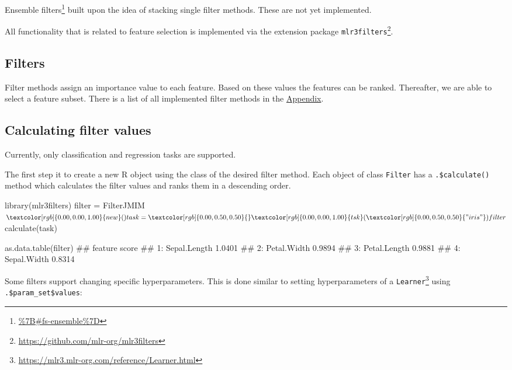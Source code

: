 \documentclass[12pt,]{scrbook}
\newenvironment{Shaded}{}{}
\newcommand{\KeywordTok}[1]{\textcolor[rgb]{0.00,0.00,1.00}{#1}}
\newcommand{\NormalTok}[1]{#1}
\newcommand{\OperatorTok}[1]{#1}
\newcommand{\StringTok}[1]{\textcolor[rgb]{0.00,0.50,0.50}{#1}}
\renewcommand{\href}[2]{#2\footnote{\url{#1}}}
\begin{document}
\href{\%7B\#fs-ensemble\%7D}{Ensemble filters} built upon the idea of stacking single filter methods.
These are not yet implemented.

All functionality that is related to feature selection is implemented via the extension package \href{https://github.com/mlr-org/mlr3filters}{\texttt{mlr3filters}}.

\hypertarget{fs-filter}{%
\subsection{Filters}\label{fs-filter}}

Filter methods assign an importance value to each feature.
Based on these values the features can be ranked.
Thereafter, we are able to select a feature subset.
There is a list of all implemented filter methods in the \protect\hyperlink{list-filters}{Appendix}.

\hypertarget{fs-calc}{%
\subsection{Calculating filter values}\label{fs-calc}}

Currently, only classification and regression tasks are supported.

The first step it to create a new R object using the class of the desired filter method.
Each object of class \texttt{Filter} has a \texttt{.\$calculate()} method which calculates the filter values and ranks them in a descending order.

\begin{Shaded}
\begin{Highlighting}[]
\KeywordTok{library}\NormalTok{(mlr3filters)}
\NormalTok{filter =}\StringTok{ }\NormalTok{FilterJMIM}\OperatorTok{$}\KeywordTok{new}\NormalTok{()}

\NormalTok{task =}\StringTok{ }\KeywordTok{tsk}\NormalTok{(}\StringTok{"iris"}\NormalTok{)}
\NormalTok{filter}\OperatorTok{$}\KeywordTok{calculate}\NormalTok{(task)}

\KeywordTok{as.data.table}\NormalTok{(filter)}
\NormalTok{##         feature  score}
\NormalTok{## 1: Sepal.Length 1.0401}
\NormalTok{## 2:  Petal.Width 0.9894}
\NormalTok{## 3: Petal.Length 0.9881}
\NormalTok{## 4:  Sepal.Width 0.8314}
\end{Highlighting}
\end{Shaded}

Some filters support changing specific hyperparameters.
This is done similar to setting hyperparameters of a \href{https://mlr3.mlr-org.com/reference/Learner.html}{\texttt{Learner}} using \texttt{.\$param\_set\$values}:
\end{document}
